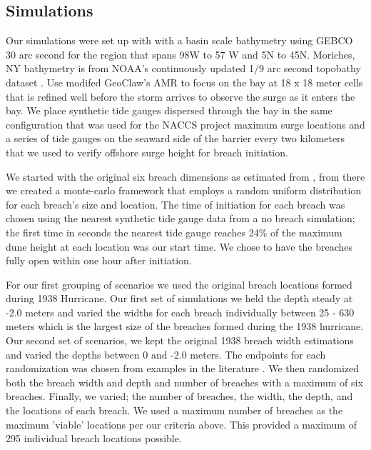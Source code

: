 \documentclass{coastal_paper}
\begin{document}
\subsection*{Simulations} 
Our simulations were set up with with a basin scale bathymetry using GEBCO 30 arc second \citep{weatherall2015new} for the region that spans 98W to 57 W and 5N to 45N. Moriches, NY bathymetry  is from NOAA's continuously updated 1/9 arc second topobathy dataset \citep{cires2014continuously}. Use modifed GeoClaw's AMR to focus on the bay at 18 x 18 meter cells that is refined well before the storm arrives to observe the surge as it enters the bay. We place synthetic tide gauges dispersed through the bay in the same configuration that was used for the NACCS project maximum surge locations \citep{NACCS} and a series of tide gauges on the seaward side of the barrier every two kilometers that we used to verify offshore surge height for breach initiation.

We started with the original six breach dimensions as estimated from \citet{Canizares2008}, from there we created a monte-carlo framework that employs a random uniform distribution for each breach's size and location. The time of initiation for each breach was chosen using the nearest synthetic tide gauge data from a no breach simulation; the first time in seconds the nearest tide gauge reaches 24\% of the maximum dune height at each location was our start time. We chose to have the breaches fully open within one hour after initiation.

For our first grouping of scenarios we used the original breach locations formed during 1938 Hurricane. Our first set of simulations we held the depth steady at -2.0 meters and varied the widths for each breach individually between 25 - 630 meters which is the largest size of the breaches formed during the 1938 hurricane. Our second set of scenarios, we kept the original 1938 breach width estimations and varied the depths between 0 and -2.0 meters. The endpoints for each randomization was chosen from examples in the literature \citep{Schmeltz1983Breach/InletInlet., Kraus2003a,Visser1999, Canizares2008}. We then randomized both the breach width and depth and number of breaches with a maximum of six breaches. 
Finally, we varied; the number of breaches, the width, the depth, and the locations of each breach. We used a maximum number of breaches as the maximum 'viable' locations per our criteria above. This provided a maximum of 295 individual breach locations possible.
\end{document}
